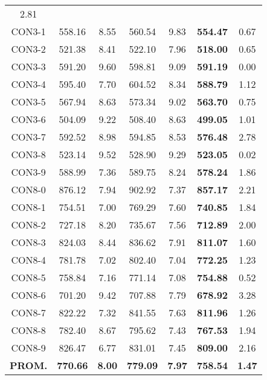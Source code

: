 \begin{table}[h]
\begin{tabular}{c c c c c c c}
2.81\\CON3-1 & 558.16 & 8.55 & 
560.54 & 9.83 & \bf{554.47} & 
0.67\\CON3-2 & 521.38 & 8.41 & 
522.10 & 7.96 & \bf{518.00} & 
0.65\\CON3-3 & 591.20 & 9.60 & 
598.81 & 9.09 & \bf{591.19} & 
0.00\\CON3-4 & 595.40 & 7.70 & 
604.52 & 8.34 & \bf{588.79} & 
1.12\\CON3-5 & 567.94 & 8.63 & 
573.34 & 9.02 & \bf{563.70} & 
0.75\\CON3-6 & 504.09 & 9.22 & 
508.40 & 8.63 & \bf{499.05} & 
1.01\\CON3-7 & 592.52 & 8.98 & 
594.85 & 8.53 & \bf{576.48} & 
2.78\\CON3-8 & 523.14 & 9.52 & 
528.90 & 9.29 & \bf{523.05} & 
0.02\\CON3-9 & 588.99 & 7.36 & 
589.75 & 8.24 & \bf{578.24} & 
1.86\\CON8-0 & 876.12 & 7.94 & 
902.92 & 7.37 & \bf{857.17} & 
2.21\\CON8-1 & 754.51 & 7.00 & 
769.29 & 7.60 & \bf{740.85} & 
1.84\\CON8-2 & 727.18 & 8.20 & 
735.67 & 7.56 & \bf{712.89} & 
2.00\\CON8-3 & 824.03 & 8.44 & 
836.62 & 7.91 & \bf{811.07} & 
1.60\\CON8-4 & 781.78 & 7.02 & 
802.40 & 7.04 & \bf{772.25} & 
1.23\\CON8-5 & 758.84 & 7.16 & 
771.14 & 7.08 & \bf{754.88} & 
0.52\\CON8-6 & 701.20 & 9.42 & 
707.88 & 7.79 & \bf{678.92} & 
3.28\\CON8-7 & 822.22 & 7.32 & 
841.55 & 7.63 & \bf{811.96} & 
1.26\\CON8-8 & 782.40 & 8.67 & 
795.62 & 7.43 & \bf{767.53} & 
1.94\\CON8-9 & 826.47 & 6.77 & 
831.01 & 7.45 & \bf{809.00} & 
2.16\\\bf{PROM.} & 
\bf{770.66} & \bf{8.00} & \bf{779.09} & \bf{7.97} & \bf{758.54} & \bf{1.47}\\[1ex]\hline
\end{tabular}
\label{table:ILS-VND-M-55-40}
\end{table}

